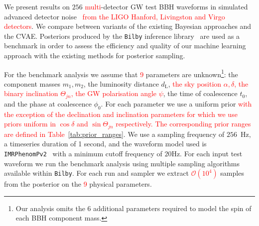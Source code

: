 \documentclass[%
showpacs,
 amsmath,amssymb,
 aps,
 twocolumn,
 prl,
 reprint,
floatfix,
]{revtex4-1}
\newcommand{\new}[1]{\textcolor{red}{#1}}
\begin{document}
%
%

%
%
%
%
We present results on $256$ \new{multi}-detector \ac{GW} test \ac{BBH}
waveforms in simulated advanced detector noise~\cite{aligo_noisecurves} \new{from
the LIGO Hanford, Livingston and Virgo detectors}. We compare between
variants of the existing Bayesian approaches and the \ac{CVAE}. Posteriors
produced by the \texttt{Bilby} inference library~\cite{1811.02042} are used as
a benchmark in order to assess the efficiency and quality of our machine
learning approach with the existing methods for posterior sampling.

%
%
For the benchmark analysis we assume that \new{9} parameters are
unknown\footnote{Our analysis omits the 6 additional parameters required to
model the spin of each \ac{BBH} component mass.}: the component masses $m_1,m_2$, the
luminosity distance $d_{\text{L}}$, \new{the sky position $\alpha,\delta$, the
binary inclination $\Theta_{jn}$, the \ac{GW} polarisation angle ${\psi}$}, the
time of coalescence $t_{0}$, and the phase at coalescence $\phi_0$. For each
parameter we use a uniform prior \new{with the exception of the declination and
inclination parameters for which we use priors uniform in $\cos\delta$ and
$\sin\Theta_{jn}$ respectively. The corresponding prior ranges are defined in
Table~\ref{tab:prior_ranges}}. We use a sampling frequency of $256$~Hz, a
timeseries duration of 1 second, and the waveform model used is
\texttt{IMRPhenomPv2}~\cite{1809.10113} with a minimum cutoff frequency of
$20$Hz. For each input test waveform we run the benchmark analysis using
multiple sampling algorithms available within \texttt{Bilby}. For each run and
sampler we extract \new{$\mathcal{O}(10^4)$} samples from the posterior on the
\new{9} physical parameters.  
\end{document}
